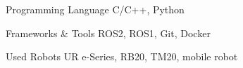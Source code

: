 

\begin{cvskills}

  \cvskill
    {Programming Language} %
    {C/C++, Python} %

  \cvskill
    {Frameworks \& Tools} %
    {ROS2, ROS1, Git, Docker} %


  \cvskill
    {Used Robots} %
    {UR e-Series, RB20, TM20, mobile robot} %


\end{cvskills}

